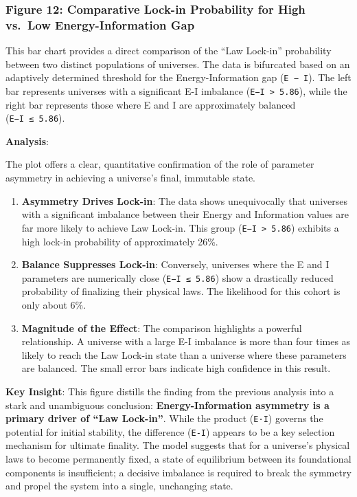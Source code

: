 \subsubsection{Figure 12: Comparative Lock-in Probability for High
vs.~Low Energy-Information
Gap}\label{figure-12-comparative-lock-in-probability-for-high-vs.-low-energy-information-gap}

This bar chart provides a direct comparison of the ``Law Lock-in''
probability between two distinct populations of universes. The data is
bifurcated based on an adaptively determined threshold for the
Energy-Information gap (\texttt{\textbar{}E\ −\ I\textbar{}}). The left
bar represents universes with a significant E-I imbalance
(\texttt{\textbar{}E−I\textbar{}\ \textgreater{}\ 5.86}), while the
right bar represents those where E and I are approximately balanced
(\texttt{\textbar{}E−I\textbar{}\ ≤\ 5.86}).

\textbf{Analysis}:

The plot offers a clear, quantitative confirmation of the role of
parameter asymmetry in achieving a universe's final, immutable state.

\begin{enumerate}
\def\labelenumi{\arabic{enumi}.}
\item
  \textbf{Asymmetry Drives Lock-in}: The data shows unequivocally that
  universes with a significant imbalance between their Energy and
  Information values are far more likely to achieve Law Lock-in. This
  group (\texttt{\textbar{}E−I\textbar{}\ \textgreater{}\ 5.86})
  exhibits a high lock-in probability of approximately 26\%.
\item
  \textbf{Balance Suppresses Lock-in}: Conversely, universes where the E
  and I parameters are numerically close
  (\texttt{\textbar{}E−I\textbar{}\ ≤\ 5.86}) show a drastically reduced
  probability of finalizing their physical laws. The likelihood for this
  cohort is only about 6\%.
\item
  \textbf{Magnitude of the Effect}: The comparison highlights a powerful
  relationship. A universe with a large E-I imbalance is more than four
  times as likely to reach the Law Lock-in state than a universe where
  these parameters are balanced. The small error bars indicate high
  confidence in this result.
\end{enumerate}

\textbf{Key Insight}: This figure distills the finding from the previous
analysis into a stark and unambiguous conclusion:
\textbf{Energy-Information asymmetry is a primary driver of ``Law
Lock-in''}. While the product (\texttt{E·I}) governs the potential for
initial stability, the difference (\texttt{\textbar{}E-I\textbar{}})
appears to be a key selection mechanism for ultimate finality. The model
suggests that for a universe's physical laws to become permanently
fixed, a state of equilibrium between its foundational components is
insufficient; a decisive imbalance is required to break the symmetry and
propel the system into a single, unchanging state.

